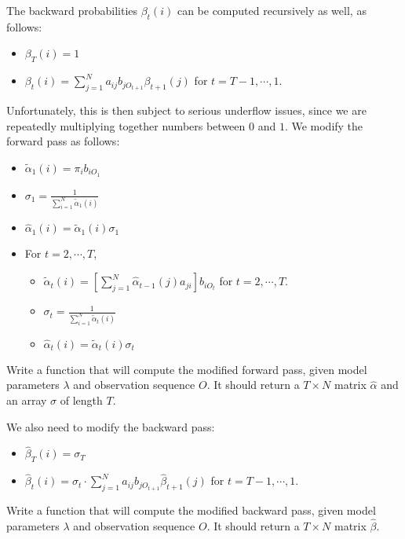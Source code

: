 The backward probabilities $\beta_{t}(i)$ can be computed recursively as well, as follows:
\begin{itemize}
 \item $\beta_{T}(i) = 1$
 \item $\beta_{t}(i) = \sum_{j=1}^{N} a_{ij}b_{jO_{t+1}}\beta_{t+1}(j)$ for $t = T-1, \cdots, 1$.
\end{itemize}
Unfortunately, this is then subject to serious underflow issues, since we are repeatedly multiplying together numbers between $0$ and $1$. We modify the forward pass as follows:
\begin{itemize}
 \item $\tilde{\alpha}_{1}(i) = \pi_{i} b_{iO_{1}}$
 \item $\sigma_{1} = \frac{1}{\sum_{i=1}^{N} \tilde{\alpha}_{1}(i)}$
 \item $\widehat{\alpha}_{1}(i) = \tilde{\alpha}_{1}(i) \sigma_{1}$
 \item For $t = 2, \cdots, T$,
 \begin{itemize}
	 \item $\tilde{\alpha}_{t}(i) = \left[ \sum_{j=1}^{N} \widehat{\alpha}_{t-1}(j)a_{ji}\right] b_{iO_{t}}$ for $t = 2,\cdots,T.$
	 \item $\sigma_{t} = \frac{1}{\sum_{i=1}^{N} \tilde{\alpha}_{t}(i)}$
	 \item $\widehat{\alpha}_{t}(i) = \tilde{\alpha}_{t}(i) \sigma_{t}$
 \end{itemize}
\end{itemize}

\begin{problem}
Write a function that will compute the modified forward pass, given model parameters $\lambda$ and observation sequence $O$. It should return a $T \times N$ matrix $\widehat{\alpha}$ and an array $\sigma$ of length $T$.
\end{problem}

We also need to modify the backward pass:
\begin{itemize}
 \item $\widehat{\beta}_{T}(i) = \sigma_{T}$
 \item $\widehat{\beta}_{t}(i) = \sigma_{t} \cdot \sum_{j=1}^{N} a_{ij}b_{jO_{t+1}}\widehat{\beta}_{t+1}(j)$ for $t = T-1, \cdots, 1$.
\end{itemize}

\begin{problem}
Write a function that will compute the modified backward pass, given model parameters $\lambda$ and observation sequence $O$. It should return a $T \times N$ matrix $\widehat{\beta}$.
\end{problem}

